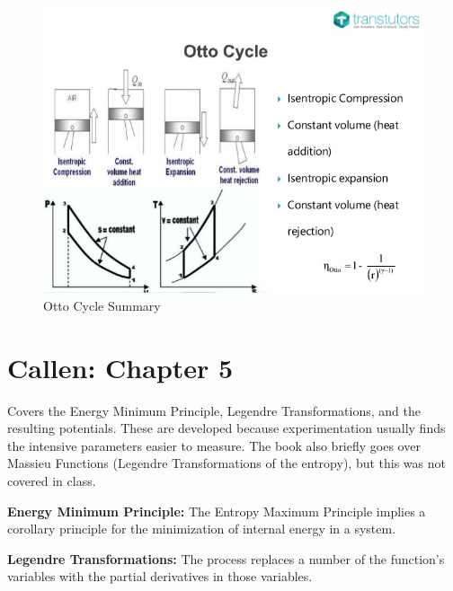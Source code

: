 \begin{figure}[ht]
    \centering
    \includegraphics[scale=.4]{Images/otto-cycle.jpg}
    \caption{Otto Cycle Summary}
    \label{fig:otto}
\end{figure}

\section{Callen: Chapter 5}
Covers the Energy Minimum Principle, Legendre Transformations, and the resulting potentials. These are developed because experimentation usually finds the intensive parameters easier to measure. The book also briefly goes over Massieu Functions (Legendre Transformations of the entropy), but this was not covered in class.

\textbf{Energy Minimum Principle:} The Entropy Maximum Principle implies a corollary principle for the minimization of internal energy in a system.

\textbf{Legendre Transformations:} The process replaces a number of the function's variables with the partial derivatives in those variables. 

